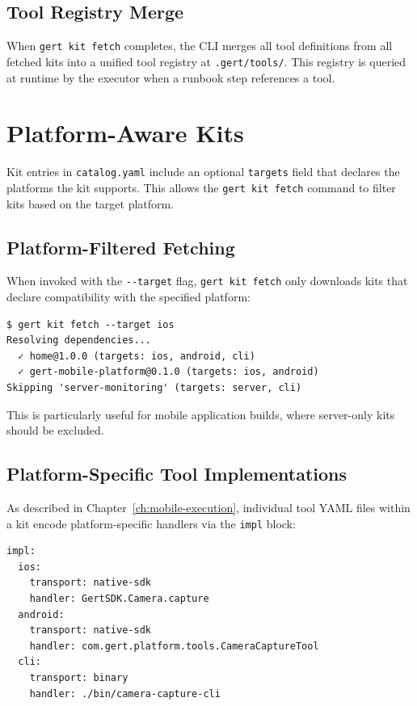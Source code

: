 \subsection{Tool Registry Merge}

When \texttt{gert kit fetch} completes, the CLI merges all tool definitions from all fetched kits into a unified tool registry at \texttt{.gert/tools/}. This registry is queried at runtime by the executor when a runbook step references a tool.

\section{Platform-Aware Kits}
\label{sec:platform-aware}

Kit entries in \texttt{catalog.yaml} include an optional \texttt{targets} field that declares the platforms the kit supports. This allows the \texttt{gert kit fetch} command to filter kits based on the target platform.

\subsection{Platform-Filtered Fetching}

When invoked with the \texttt{-{}-target} flag, \texttt{gert kit fetch} only downloads kits that declare compatibility with the specified platform:

\begin{verbatim}
$ gert kit fetch --target ios
Resolving dependencies...
  ✓ home@1.0.0 (targets: ios, android, cli)
  ✓ gert-mobile-platform@0.1.0 (targets: ios, android)
Skipping 'server-monitoring' (targets: server, cli)
\end{verbatim}

This is particularly useful for mobile application builds, where server-only kits should be excluded.

\subsection{Platform-Specific Tool Implementations}

As described in Chapter~\ref{ch:mobile-execution}, individual tool YAML files within a kit encode platform-specific handlers via the \texttt{impl} block:

\begin{verbatim}
impl:
  ios:
    transport: native-sdk
    handler: GertSDK.Camera.capture
  android:
    transport: native-sdk
    handler: com.gert.platform.tools.CameraCaptureTool
  cli:
    transport: binary
    handler: ./bin/camera-capture-cli
\end{verbatim}

